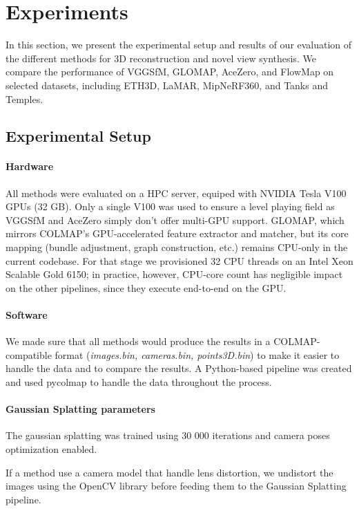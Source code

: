 \chapter{Experiments}\label{chap:experiments}

In this section, we present the experimental setup and results of our evaluation of the different methods for 3D reconstruction and novel view synthesis. 
We compare the performance of VGGSfM, GLOMAP, AceZero, and FlowMap on selected datasets, including ETH3D, LaMAR, MipNeRF360, and Tanks and Temples.

\section{Experimental Setup}\label{sec:experimental-setup}
\subsubsection{Hardware}
All methods were evaluated on a HPC server, equiped with NVIDIA Tesla V100 GPUs (32 GB). Only a single V100 was used to ensure a level playing field as VGGSfM and AceZero simply don't offer multi-GPU support.
GLOMAP, which mirrors COLMAP's GPU-accelerated feature extractor and matcher, but its core mapping (bundle adjustment, graph construction, etc.) remains CPU-only in the current codebase. 
For that stage we provisioned 32 CPU threads on an Intel Xeon Scalable Gold 6150; in practice, however, CPU-core count has negligible impact on the other pipelines, since they execute end-to-end on the GPU.

\subsubsection{Software}
We made sure that all methods would produce the results in a COLMAP-compatible format (\textit{images.bin, cameras.bin, points3D.bin}) to make it easier to handle the data and to compare the results.
A Python-based pipeline was created and used pycolmap to handle the data throughout the process.

\subsubsection{Gaussian Splatting parameters}
The gaussian splatting was trained using 30 000 iterations and camera poses optimization enabled.

If a method use a camera model that handle lens distortion, we undistort the images using the OpenCV library \cite{opencv_library} before feeding them to the Gaussian Splatting pipeline.


